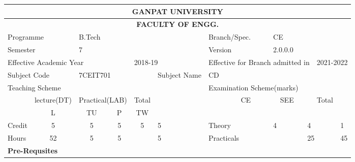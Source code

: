 \documentclass[a4paper]{article}%
\begin{document}
%
\normalsize%
\setlength{\tabcolsep}{3.5pt}
                    \centering
\setlength{\tabcolsep}{3.5pt}
                    \centering
\begin{longtable}{|c|c|c|c|c|c|c|c|c|c|c|c|c|c|c|c|}%
\hline%
\multicolumn{16}{|c|}{\LARGE{\textbf{GANPAT UNIVERSITY}}}\\%
\hline%
\multicolumn{16}{|c|}{\LARGE{\textbf{FACULTY OF ENGG.}}}\\%
\hline%
\multicolumn{3}{|l|}{Programme%
\cellcolor{black!30}}&\multicolumn{5}{l|}{B.Tech}&\multicolumn{2}{l|}{Branch/Spec.%
\cellcolor{black!30}}&\multicolumn{6}{l|}{CE}\\%
\hline%
\multicolumn{3}{|l|}{Semester%
\cellcolor{black!30}}&\multicolumn{5}{l|}{7}&\multicolumn{2}{l|}{Version%
\cellcolor{black!30}}&\multicolumn{6}{l|}{2.0.0.0}\\%
\hline%
\multicolumn{5}{|l|}{Effective Academic Year%
\cellcolor{black!30}}&\multicolumn{3}{l|}{2018{-}19}&\multicolumn{5}{l|}{Effective for Branch admitted in%
\cellcolor{black!30}}&\multicolumn{3}{l|}{2021{-}2022}\\%
\hline%
\multicolumn{3}{|l|}{Subject Code%
\cellcolor{black!30}}&\multicolumn{3}{l|}{7CEIT701}&\multicolumn{2}{l|}{Subject Name%
\cellcolor{black!30}}&\multicolumn{8}{l|}{CD}\\%
\hline%
\multicolumn{8}{|l|}{Teaching Scheme%
\cellcolor{black!30}}&\multicolumn{8}{l|}{Examination Scheme(marks)%
\cellcolor{black!30}}\\%
\hline%
\rowcolor{black!30}%
\multicolumn{2}{|l|}{per week}&\multicolumn{2}{l|}{lecture(DT)}&\multicolumn{2}{l|}{Practical(LAB)}&\multicolumn{2}{l|}{Total}&\multicolumn{2}{l|}{}&\multicolumn{2}{l|}{CE}&\multicolumn{2}{l|}{SEE}&\multicolumn{2}{l|}{Total}\\%
\hline%
\multicolumn{2}{|l|}{}&L&TU&P&TW&\multicolumn{2}{l|}{}&\multicolumn{2}{l|}{}&\multicolumn{2}{l|}{}&\multicolumn{2}{l|}{}&\multicolumn{2}{l|}{}\\%
\hline%
\multicolumn{2}{|l|}{Credit}&5&5&5&5&\multicolumn{2}{l|}{5}&\multicolumn{2}{l|}{Theory}&\multicolumn{2}{l|}{4}&\multicolumn{2}{l|}{4}&\multicolumn{2}{l|}{1}\\%
\hline%
\multicolumn{2}{|l|}{Hours}&52&5&5&&\multicolumn{2}{l|}{5}&\multicolumn{2}{l|}{Practicals}&\multicolumn{2}{l|}{}&\multicolumn{2}{l|}{25}&\multicolumn{2}{l|}{45}\\%
\hline%
\multicolumn{16}{|l|}{\textbf{Pre{-}Requsites}%
\cellcolor{black!30}}\\%
\hline%

\end{longtable}
\end{document}
